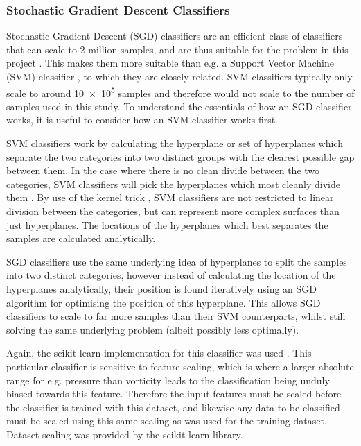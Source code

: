\documentclass[pdftex,12pt,a4paper]{report}
\begin{document}
\subsubsection{Stochastic Gradient Descent Classifiers}
Stochastic Gradient Descent (SGD) classifiers are an efficient class of classifiers that can scale
to 2 million samples, and are thus suitable for the problem in this project
\parencite{singer07pegasos, bottou2008tradeoffs}. This makes them more suitable than e.g. a Support
Vector Machine (SVM) classifier \parencite{cortes1995support}, to which they are closely related.
SVM classifiers typically only scale to around \SI{10e5}{} samples and therefore would not scale to
the number of samples used in this study. To understand the essentials of how an SGD classifier
works, it is useful to consider how an SVM classifier works first.

SVM classifiers work by calculating the hyperplane or set of hyperplanes which separate the two
categories into two distinct groups with the clearest possible gap between them. In the case where
there is no clean divide between the two categories, SVM classifiers will pick the hyperplanes which
most cleanly divide them \parencite{cortes1995support}. By use of the kernel trick
\parencite{aizerman1964theoretical}, SVM classifiers are not restricted to linear division between
the categories, but can represent more complex surfaces than just hyperplanes. The locations of the
hyperplanes which best separates the samples are calculated analytically.

SGD classifiers use the same underlying idea of hyperplanes to split the samples into two distinct
categories, however instead of calculating the location of the hyperplanes analytically, their
position is found iteratively using an SGD algorithm for optimising the position of this hyperplane.
This allows SGD classifiers to scale to far more samples than their SVM counterparts, whilst still
solving the same underlying problem (albeit possibly less optimally).

Again, the scikit-learn implementation for this classifier was used \parencite{scikitLearn2011}.
This particular classifier is sensitive to feature scaling, which is where a larger absolute range
for e.g. pressure than vorticity leads to the classification being unduly biased towards this
feature. Therefore the input features must be scaled before the classifier is trained with this
dataset, and likewise any data to be classified must be scaled using this same scaling as was used
for the training dataset. Dataset scaling was provided by the scikit-learn library.
\end{document}
